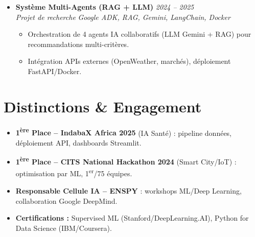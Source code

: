 \documentclass[a4paper,11pt]{article}
\begin{document}
\begin{itemize}[leftmargin=*, label={-}]
\item \textbf{Système Multi-Agents (RAG + LLM)} \hfill \textit{2024 -- 2025} \\
\textit{Projet de recherche} \hfill \textit{Google ADK, RAG, Gemini, LangChain, Docker}
\vspace{-2pt}
    \begin{itemize}[leftmargin=0.4cm, nosep, label=\tiny$\bullet$]
        \item \small{Orchestration de 4 agents IA collaboratifs (LLM Gemini + RAG) pour recommandations multi-critères.}
        \item \small{Intégration APIs externes (OpenWeather, marchés), déploiement FastAPI/Docker.}
    \end{itemize}
\vspace{3pt}

\end{itemize}

\section{Distinctions \& Engagement}
\begin{itemize}[leftmargin=*, nosep, label=\tiny$\bullet$]
    \item \small{\textbf{1\textsuperscript{ère} Place -- IndabaX Africa 2025} (IA Santé) : pipeline données, déploiement API, dashboards Streamlit.}
    \item \small{\textbf{1\textsuperscript{ère} Place -- CITS National Hackathon 2024} (Smart City/IoT) : optimisation par ML, 1\textsuperscript{er}/75 équipes.}
    \item \small{\textbf{Responsable Cellule IA -- ENSPY} : workshops ML/Deep Learning, collaboration Google DeepMind.}
    \item \small{\textbf{Certifications :} Supervised ML (Stanford/DeepLearning.AI), Python for Data Science (IBM/Coursera).}
\end{itemize}
\end{document}
